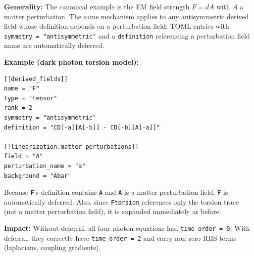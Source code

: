 \textbf{Generality:} The canonical example is the EM field strength $F = dA$ with $A$
a matter perturbation.  The same mechanism applies to any antisymmetric derived
field whose definition depends on a perturbation field; TOML entries with
\texttt{symmetry = "antisymmetric"} and a \texttt{definition} referencing a
perturbation field name are automatically deferred.

\textbf{Example (dark photon torsion model):}

\begin{lstlisting}[style=toml]
[[derived_fields]]
name = "F"
type = "tensor"
rank = 2
symmetry = "antisymmetric"
definition = "CD[-a][A[-b]] - CD[-b][A[-a]]"

[[linearization.matter_perturbations]]
field = "A"
perturbation_name = "a"
background = "Abar"
\end{lstlisting}

Because \texttt{F}'s definition contains \texttt{A} and \texttt{A} is a matter
perturbation field, \texttt{F} is automatically deferred.  Also, since \texttt{Ftorsion}
references only the torsion trace (not a matter perturbation field), it is expanded
immediately as before.

\textbf{Impact:} Without deferral, all four photon equations had
\texttt{time\_order = 0}.  With deferral, they correctly have \texttt{time\_order = 2}
and carry non-zero RHS terms (laplacians, coupling gradients).
